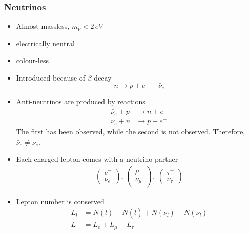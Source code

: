 \documentclass[a4paper, 11pt, normalem]{report}
\begin{document}
\subsection{Neutrinos}
\begin{itemize}
    \item Almost massless, $m_\nu < 2\,eV$
    \item electrically neutral
    \item colour-less
    \item Introduced because of $\beta$-decay
        \begin{equation}
            n \to p + e^- + \bar{\nu}_e
        \end{equation}
    \item Anti-neutrinos are produced by reactions
        \begin{align}
            \bar{\nu}_e + p &\to n + e^+ \\
            \nu_e + n &\to p + e^-
        \end{align}
        The first has been observed, while the second is not observed. 
        Therefore, $\bar{\nu}_e \neq \nu_e$.
    \item Each charged lepton comes with a neutrino partner
        \begin{align}
            \begin{pmatrix} e^- \\ \nu_e\end{pmatrix},~  \begin{pmatrix} \mu^- \\ \nu_\mu\end{pmatrix},~ \begin{pmatrix} \tau^- \\ \nu_\tau\end{pmatrix}
        \end{align}
    \item Lepton number is conserved
        \begin{align}
            L_l &= N(l) - N(\bar{l}) +  N(\nu_l) - N(\bar{\nu}_l) \\
            L &= L_e + L_\mu + L_\tau
        \end{align}
\end{itemize}

\chapter{}
\end{document}
